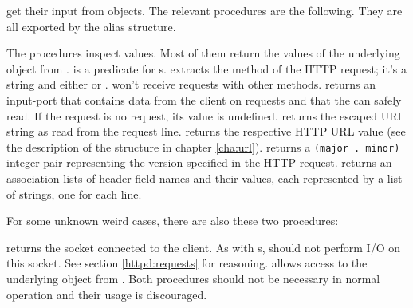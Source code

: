 \surflets get their input from  objects.   The
relevant procedures are the following.  They are all exported by the
 alias  structure.

\begin{desc}
  The procedures inspect  values.  Most of them
  return the values of the underlying  object from
  .   is a predicate for s.   extracts the method of the
  HTTP request; it's a string and either  or .
  \surflets won't receive requests with other methods.
   returns an input-port that contains
  data from the client on  requests and that the \surflet can
  safely read.  If the request is no  request, its value is
  undefined.   returns the escaped URI string
  as read from the request line.   returns the
  respective HTTP URL value (see the description of the 
  structure in chapter \ref{cha:url}).  
  returns a \verb|(major . minor)| integer pair representing the
  version specified in the HTTP request.  
  returns an association lists of header field names and their values,
  each represented by a list of strings, one for each line.
\end{desc}

For some unknown weird cases, there are also these two procedures:

\begin{desc}
   returns the socket connected to the
  client.  As with s, \surflets should not perform I/O on
  this socket.  See section \ref{httpd:requests} for reasoning.
   allows access to the underlying
   object from .  Both procedures should not be
  necessary in normal operation and their usage is discouraged.
\end{desc}


